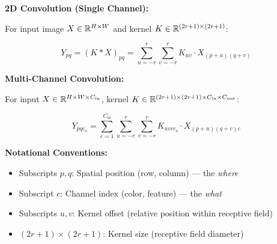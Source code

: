 \begin{seanbox}{3.1}
	\textbf{2D Convolution (Single Channel):}
	
	For input image $X \in \mathbb{R}^{H \times W}$ and kernel $K \in \mathbb{R}^{(2r+1) \times (2r+1)}$:
	
	\begin{equation}
		Y_{pq} = (K \ast X)_{pq} = \sum_{u=-r}^r \sum_{v=-r}^r K_{uv} \cdot X_{(p+u)(q+v)}
	\end{equation}
	
	\textbf{Multi-Channel Convolution:}
	
	For input $X \in \mathbb{R}^{H \times W \times C_{\text{in}}}$, kernel $K \in \mathbb{R}^{(2r+1) \times (2r+1) \times C_{\text{in}} \times C_{\text{out}}}$:
	
	\begin{equation}
		Y_{pqc_o} = \sum_{c=1}^{C_{\text{in}}} \sum_{u=-r}^r \sum_{v=-r}^r K_{uvc c_o} \cdot X_{(p+u)(q+v)c}
	\end{equation}
	
	\textbf{Notational Conventions:}
	\begin{itemize}
		\item Subscripts $p, q$: Spatial position (row, column) --- the \textit{where}
		\item Subscript $c$: Channel index (color, feature) --- the \textit{what}
		\item Subscripts $u, v$: Kernel offset (relative position within receptive field)
		\item $(2r+1) \times (2r+1)$: Kernel size (receptive field diameter)
	\end{itemize}
\end{seanbox}

